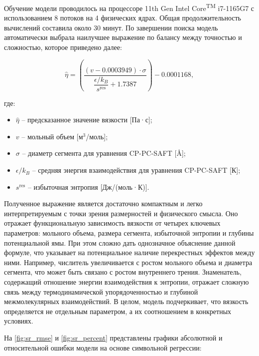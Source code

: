 \documentclass[a4paper,12pt]{article}
\begin{document}
Обучение модели проводилось на процессоре 11th Gen Intel\textsuperscript{\textregistered} Core\textsuperscript{TM} i7-1165G7 с использованием 8 потоков на 4 физических ядрах. Общая продолжительность вычислений составила около 30 минут. По завершении поиска модель автоматически выбрала наилучшее выражение по балансу между точностью и сложностью, которое приведено далее:
    
    \begin{equation}
    \hat{\eta} = \left( \frac{(v - 0.0003949) \cdot \sigma}{\dfrac{\epsilon / k_B}{s^{\text{res}}} + 1.7387} \right) - 0.0001168,
    \end{equation}
    
    где:
    \begin{itemize}
      \item \( \hat{\eta} \) -- предсказанное значение вязкости [Па·с];
      \item \( v \) -- мольный объем [м\(^3\)/моль];
      \item \( \sigma \) -- диаметр сегмента для уравнения CP-PC-SAFT [\si{\angstrom}];
      \item \( \epsilon/k_B \) -- средняя энергия взаимодействия для уравнения CP-PC-SAFT [К];
      \item \( s^{\text{res}} \) -- избыточная энтропия [Дж/(моль·К)].
    \end{itemize}

    Полученное выражение является достаточно компактным и легко интерпретируемым с точки зрения размерностей и физического смысла. Оно отражает функциональную зависимость вязкости от четырех ключевых параметров: мольного объема, размера сегмента, избыточной энтропии и глубины потенциальной ямы. При этом сложно дать однозначное объяснение данной формуле, что указывает на потенциальное наличие перекрестных эффектов между ними. Например, числитель увеличивается с ростом мольного объема и диаметра сегмента, что может быть связано с ростом внутреннего трения. Знаменатель, содержащий отношение энергии взаимодействия к энтропии, отражает сложную связь между термодинамической упорядоченностью и глубиной межмолекулярных взаимодействий. В целом, модель подчеркивает, что вязкость определяется не отдельным параметром, а их соотношением в конкретных условиях.

    \medskip
    
    На \autoref{fig:sr_rmse} и \autoref{fig:sr_percent} представлены графики абсолютной и относительной ошибки модели на основе символьной регрессии:
    
\end{document}
